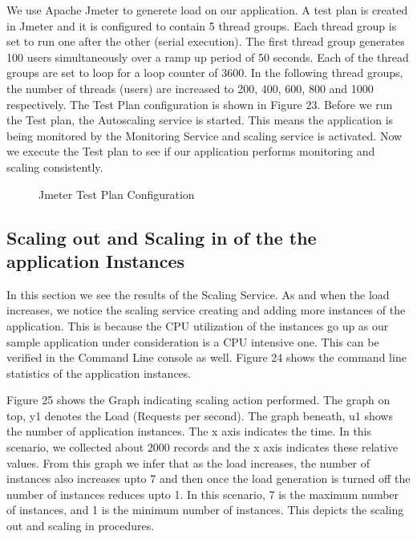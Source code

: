 \documentclass[article,type=msc,colorback,12pt,accentcolor=tud7b,table]{tudthesis}
\begin{document}
 We use Apache Jmeter to generete load on our application. A test plan is created in Jmeter and it is configured to contain 5 thread groups. Each thread group is set to run one after the other (serial execution). The first thread group generates 100 users simultaneously over a ramp up period of 50 seconds. Each of the thread groups are set to loop for a loop counter of 3600. In the following thread groups, the number of threads (users) are increased to 200, 400, 600, 800 and 1000 respectively. The Test Plan configuration is shown in Figure 23. Before we run the Test plan, the Autoscaling service is started. This means the application is being monitored by the Monitoring Service and scaling service is activated. Now we execute the Test plan to see if our application performs monitoring and scaling consistently.
 
  \begin{figure}[h]
  	\begin{center}
  		\makebox[\textwidth]{\texttt{[image: E3]}}
  	\end{center}
  	\caption{Jmeter Test Plan Configuration}
  \end{figure}
	
	\subsection{Scaling out and Scaling in of the the application Instances}
		
	In this section we see the results of the Scaling Service. As and when the load increases, we notice the scaling service creating and adding more instances of the application. This is because the CPU utilization of the instances go up as our sample application under consideration is a CPU intensive one. This can be verified in the Command Line console as well. Figure 24 shows the command line statistics of the application instances.
	
	Figure 25 shows the Graph indicating scaling action performed. The graph on top, y1 denotes the Load (Requests per second). The graph beneath, u1 shows the number of application instances. The x axis indicates the time. In this scenario, we collected about 2000 records and the x axis indicates these relative values. From this graph we infer that as the load increases, the number of instances also increases upto 7 and then once the load generation is turned off the number of instances reduces upto 1. In this scenario, 7 is the maximum number of instances, and 1 is the minimum number of instances. This depicts the scaling out and scaling in procedures. 
	
\end{document}
